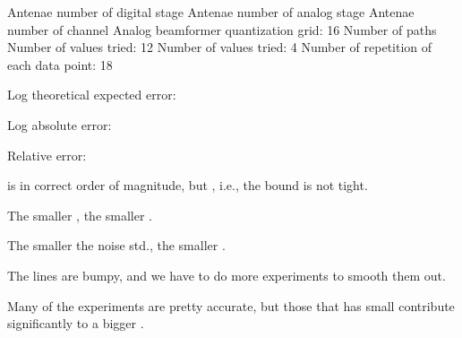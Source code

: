 
{
\I Antenae number of digital stage 
\I Antenae number of analog stage 
\I Antenae number of channel 
\I Analog beamformer quantization grid: 16
\I Number of paths 
\I Number of \m {\s} values tried: 12
\I Number of \m {\g} values tried: 4
\I Number of repetition of each data point: 18
}
{
\I Log theoretical expected error:

\I Log absolute error:

\I Relative error:
}
{
\blank [big]
}
{
\blank [big]
}
{

\I {} is in correct order of magnitude, but , i.e., the bound is not tight.

\I The smaller \m {\g}, the smaller .

\I The smaller the noise std., the smaller .

\I The lines are bumpy, and we have to do more experiments to smooth them out.

\I Many of the experiments are pretty accurate, but those that has small  contribute significantly to a bigger .
}

